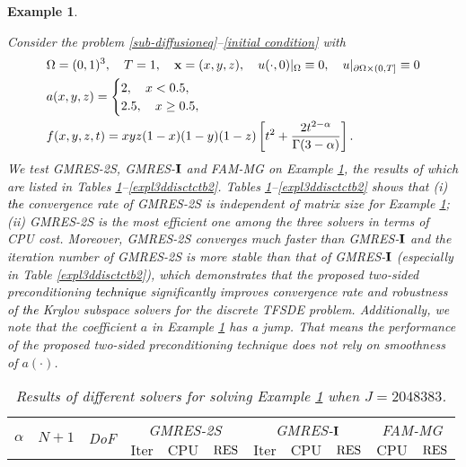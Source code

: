 \documentclass[11pt]{article}%
\numberwithin{equation}{section}
\newtheorem{example}{Example}
\begin{document}
\begin{example}\label{discticoeff3dexmpl}
	{\rm
		Consider the problem \eqref{sub-diffusioneq}--\eqref{initial condition} with
		\begin{align*}
		& \Omega=(0,1)^3,\quad T=1,\quad {\bf x}=(x,y,z),\quad u(\cdot,0)|_{\Omega}\equiv 0,\quad u|_{\partial\Omega\times(0,T]}\equiv 0\\
		&a(x,y,z)=\begin{cases}
		2,\quad x<0.5,\\
		2.5,\quad x\geq 0.5,
		\end{cases}\\
		& f(x,y,z,t)=xyz(1-x)(1-y)(1-z)\left[t^2+\frac{2t^{2-\alpha}}{\Gamma(3-\alpha)}\right].
		\end{align*}
		We test GMRES-2S, GMRES-${\bf I}$ and FAM-MG on Example \ref{discticoeff3dexmpl}, the results of which are listed in Tables \ref{expl3ddisctctb1}--\ref{expl3ddisctctb2}. Tables \ref{expl3ddisctctb1}--\ref{expl3ddisctctb2} shows that (i) \textcolor{black}{the} convergence rate of GMRES-2S is independent of matrix size for Example \ref{discticoeff3dexmpl}; (ii) GMRES-2S is the most efficient one among the three solvers in terms of CPU cost. Moreover, GMRES-2S converges much faster than GMRES-${\bf I}$ and the iteration number of GMRES-2S is more stable than that of GMRES-${\bf I}$ (especially in Table \ref{expl3ddisctctb2}), which demonstrates that the proposed two-sided preconditioning \textcolor{black}{technique} significantly improves  convergence rate and robustness of \textcolor{black}{the} Krylov subspace solvers for the discrete TFSDE problem. Additionally, we note that the coefficient $a$ in Example \ref{discticoeff3dexmpl} has a jump. That means the performance of the proposed two-sided preconditioning technique does not rely on smoothness of $a(\cdot)$.
		\begin{table}[H]
			\begin{center}
				\caption{Results of different solvers for solving Example \ref{discticoeff3dexmpl} when $J=2048383$.}\label{expl3ddisctctb1}
				\setlength{\tabcolsep}{0.48em}
				\begin{tabular}[c]{ccc|ccc|ccc|cc}
					\hline
					\multirow{2}{*}{$\alpha$} &\multirow{2}{*}{$N+1$} &\multirow{2}{*}{DoF}& \multicolumn{3}{c|}{GMRES-2S} &\multicolumn{3}{c|}{GMRES-${\bf I}$}& \multicolumn{2}{c}{FAM-MG}  \\
					\cline{4-11}
					&&&$\mathrm{Iter}$&$\mathrm{CPU}$&${\rm RES}$&$\mathrm{Iter}$&$\mathrm{CPU}$&${\rm RES}$&$\mathrm{CPU}$&${\rm RES}$\\

\end{tabular}
\end{center}
\end{table}}
\end{example}
\end{document}
